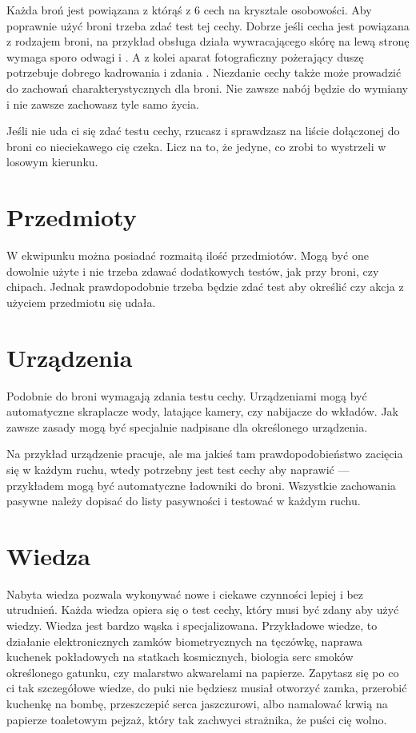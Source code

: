 Każda broń jest powiązana z którąś z 6 cech na krysztale osobowości.
Aby poprawnie użyć broni trzeba zdać test tej cechy.
Dobrze jeśli cecha jest powiązana z rodzajem broni, na przykład obsługa działa wywracającego skórę na lewą stronę wymaga sporo odwagi i \abh{}.
A z kolei aparat fotograficzny pożerający duszę potrzebuje dobrego kadrowania i zdania \abp{}.
Niezdanie cechy także może prowadzić do zachowań charakterystycznych dla broni.
Nie zawsze nabój będzie do wymiany i nie zawsze zachowasz tyle samo życia.

Jeśli nie uda ci się zdać testu cechy, rzucasz \dx{} i sprawdzasz na liście dołączonej do broni co nieciekawego cię czeka.
Licz na to, że jedyne, co zrobi to wystrzeli w losowym kierunku.

\section{Przedmioty}
W ekwipunku można posiadać rozmaitą ilość przedmiotów.
Mogą być one dowolnie użyte i nie trzeba zdawać dodatkowych testów, jak przy broni, czy chipach.
Jednak prawdopodobnie trzeba będzie zdać test aby określić czy akcja z użyciem przedmiotu się udała.

\section{Urządzenia}
Podobnie do broni wymagają zdania testu cechy.
Urządzeniami mogą być automatyczne skraplacze wody, latające kamery, czy nabijacze do wkładów.
Jak zawsze zasady mogą być specjalnie nadpisane dla określonego urządzenia.

Na przykład urządzenie pracuje, ale ma jakieś tam prawdopodobieństwo zacięcia się w każdym ruchu, wtedy potrzebny jest test cechy aby naprawić --- przykładem mogą być automatyczne ładowniki do broni.
Wszystkie zachowania pasywne należy dopisać do listy pasywności i testować w każdym ruchu.

\section{Wiedza}
Nabyta wiedza pozwala wykonywać nowe i ciekawe czynności lepiej i bez utrudnień.
Każda wiedza opiera się o test cechy, który musi być zdany aby użyć wiedzy.
Wiedza jest bardzo wąska i specjalizowana.
Przykładowe wiedze, to działanie elektronicznych zamków biometrycznych na tęczówkę, naprawa kuchenek pokładowych na statkach kosmicznych, biologia serc smoków określonego gatunku, czy malarstwo akwarelami na papierze.
Zapytasz się po co ci tak szczegółowe wiedze, do puki nie będziesz musiał otworzyć zamka, przerobić kuchenkę na bombę, przeszczepić serca jaszczurowi, albo namalować krwią na papierze toaletowym pejzaż, który tak zachwyci strażnika, że puści cię wolno.

